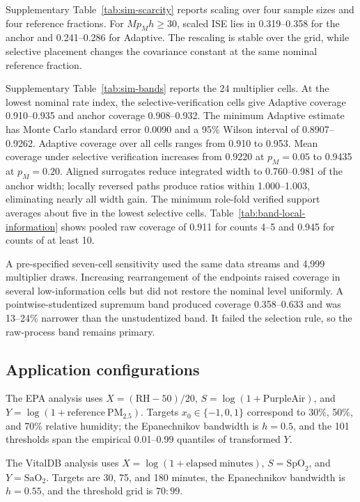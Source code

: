 Supplementary Table~\ref{tab:sim-scarcity} reports scaling over four sample
sizes and four reference fractions. For $Mp_Mh\geq30$, scaled ISE lies in
0.319--0.358 for the anchor and 0.241--0.286 for Adaptive. The rescaling is
stable over the grid, while selective placement changes the covariance
constant at the same nominal reference fraction.

Supplementary Table~\ref{tab:sim-bands} reports the 24 multiplier cells.
At the lowest nominal rate index, the selective-verification cells give
Adaptive coverage 0.910--0.935 and anchor coverage 0.908--0.932. The minimum
Adaptive estimate has Monte Carlo standard error 0.0090 and a 95\% Wilson
interval of 0.8907--0.9262. Adaptive coverage over all cells ranges from 0.910
to 0.953. Mean coverage under selective verification increases from 0.9220 at
$p_M=0.05$ to 0.9435 at $p_M=0.20$.
Aligned surrogates reduce
integrated width to 0.760--0.981 of the anchor width; locally reversed paths
produce ratios within 1.000--1.003, eliminating nearly all width gain.
The minimum role-fold verified support averages about five in the lowest
selective cells. Table~\ref{tab:band-local-information} shows pooled raw
coverage of 0.911 for counts 4--5 and 0.945 for counts of at least 10.

A pre-specified seven-cell sensitivity used the same data streams and 4,999
multiplier draws. Increasing rearrangement of the endpoints raised coverage in
several low-information cells but did not restore the nominal level uniformly.
A pointwise-studentized supremum band produced coverage 0.358--0.633 and was
13--24\% narrower than the unstudentized band. It failed the selection rule, so
the raw-process band remains primary.

\subsection{Application configurations}

The EPA analysis uses
\(X=(\mathrm{RH}-50)/20\),
\(S=\log(1+\mathrm{PurpleAir})\), and
\(Y=\log(1+\mathrm{reference\ PM}_{2.5})\). Targets
\(x_0\in\{-1,0,1\}\) correspond to 30\%, 50\%, and 70\% relative humidity;
the Epanechnikov bandwidth is \(h=0.5\), and the 101 thresholds span the
empirical 0.01--0.99 quantiles of transformed \(Y\).

The VitalDB analysis uses
\(X=\log(1+\mathrm{elapsed\ minutes})\), \(S=\mathrm{SpO}_2\), and
\(Y=\mathrm{SaO}_2\). Targets are 30, 75, and 180 minutes, the Epanechnikov
bandwidth is \(h=0.55\), and the threshold grid is \(70{:}99\).

